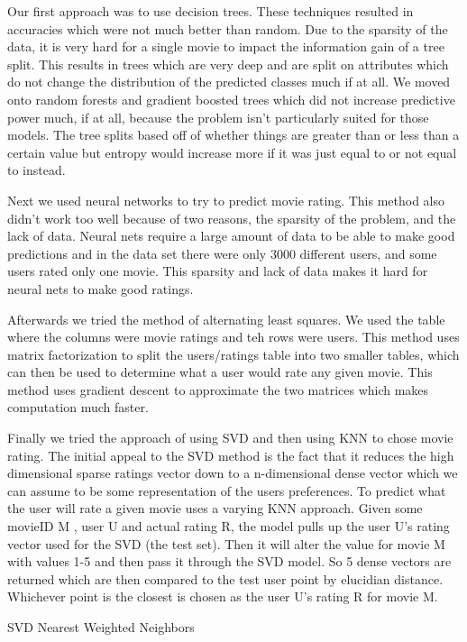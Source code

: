 \documentclass[review,onefignum,onetabnum]{siamart171218}
\begin{document}
	Our first approach was to use decision trees. These techniques resulted in accuracies which were not much better than random. Due to the sparsity of the data, it is very hard for a single movie to impact the information gain of a tree split. This results in trees which are very deep and are split on attributes which do not change the distribution of the predicted classes much if at all. We moved onto random forests and gradient boosted trees which did not increase predictive power much, if at all, because the problem isn't particularly suited for those models. The tree splits based off of whether things are greater than or less than a certain value but entropy would increase more if it was just equal to or not equal to instead.  
	
	Next we used neural networks to try to predict movie rating. This method also didn't work too well because of two reasons, the sparsity of the problem, and the lack of data. Neural nets require a large amount of data to be able to make good predictions and in the data set there were only 3000 different users, and some users rated only one movie. This sparsity and lack of data makes it hard for neural nets to make good ratings. 
	
	Afterwards we tried the method of alternating least squares. We used the table where the columns were movie ratings and teh rows were users. This method uses matrix factorization to split the users/ratings table into two smaller tables, which can then be used to determine what a user would rate any given movie. This method uses gradient descent to approximate the two matrices which makes computation much faster.
	
	Finally we tried the approach of using SVD and then using KNN to chose movie rating. The initial appeal to the SVD method is the fact that it reduces the high dimensional sparse ratings vector down to a n-dimensional dense vector which we can assume to be some representation of the users preferences. To predict what the user will rate a given movie uses a varying KNN approach. Given some movieID M , user U and actual rating R, the model pulls up the user U's rating vector used for the SVD (the test set). Then it will alter the value for movie M with values 1-5 and then pass it through the SVD model. So 5 dense vectors are returned which are then compared to the test user point by elucidian distance. Whichever point is the closest is chosen as the user U's rating R for movie M. 

\begin{algorithm}
\caption{SVD Nearest Weighted Neighbors}
\begin{algorithmic}
*W $}
\STATE{$n += 1$}

\ENDWHILE
\RETURN $W$
\end{algorithmic}
\end{algorithm}
\end{document}
